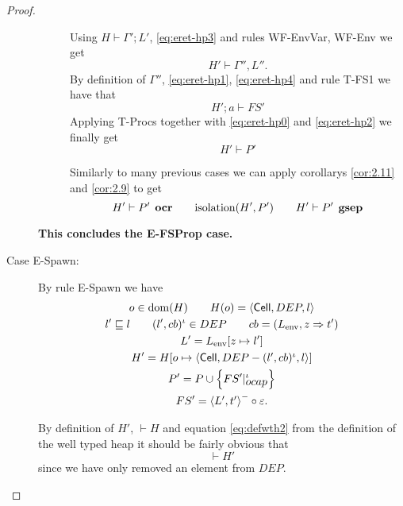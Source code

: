 \begin{proof}
\begin{description}
\begin{description}
          Using $H \vdash \Gamma'; L'$, \eqref{eq:eret-hp3} and rules {\sc WF-EnvVar}, {\sc
          WF-Env} we get
          \begin{equation} \label{eq:eret-hp4}
            H' \vdash \Gamma'', L''.
          \end{equation}
          By definition of $\Gamma''$, \eqref{eq:eret-hp1}, \eqref{eq:eret-hp4}
          and rule {\sc T-FS1} we have that
          \begin{equation} \label{eq:eret-hp2}
            H';a \vdash FS'
          \end{equation}
          Applying {\sc T-Procs} together with \eqref{eq:eret-hp0} and
          \eqref{eq:eret-hp2} we finally get
          \begin{equation}
            H' \vdash P'
          \end{equation}

          Similarly to many previous cases we can apply corollarys
          \ref{cor:2.11} and \ref{cor:2.9} to get
          \begin{equation*}
            H' \vdash P' \:\: \mbox{\bf ocr} \quad\quad \mbox{$\mathrm{isolation}$}(H', P') \quad\quad H'
            \vdash P' \:\: \mbox{\bf gsep}
          \end{equation*}
      \end{description}
      {\bf This concludes the {\sc E-FSProp} case.}
      
    \item[Case {\sc E-Spawn}:] By rule {\sc E-Spawn} we have
      \begin{equation}
        \begin{gathered} \label{eq:espawn1}
          o \in \mbox{$\mathrm{dom}$}(H) \quad\quad H(o) = \mbox{$\langle \mbox{$\mathsf{Cell}$}{}, DEP, l \rangle$} \\
          l' \sqsubseteq l \quad\quad (l', cb)^\iota \in DEP \quad\quad cb =
          (L_{\text{env}}, z \Rightarrow t') \\
          L' = L_{\text{env}}[z \mapsto l'] \\
          H' = H[o \mapsto \mbox{$\langle \mbox{$\mathsf{Cell}$}{}, DEP - (l', cb)^\iota, l \rangle$}] \\
          P' = P \cup \left\{ FS'|_{\mbox{$ocap$}}^\iota \right\} \\
          FS' = \mbox{$\langle L', t' \rangle$}^- \circ \varepsilon.
        \end{gathered}
      \end{equation}
      
      By definition of $H'$, $\vdash H$ and equation \eqref{eq:defwth2} from the
      definition of the well typed heap it should be fairly obvious that
      \begin{equation}
        \vdash H'
      \end{equation}
      since we have only removed an element from $DEP$. 



\end{description}
\end{proof}
